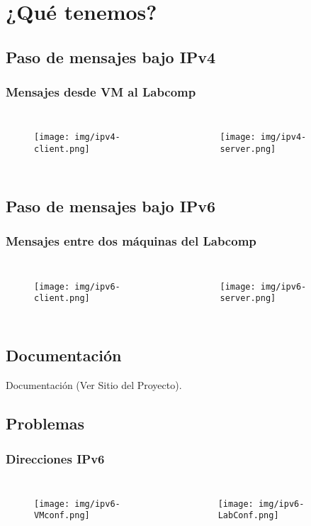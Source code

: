 \section{¿Qué tenemos?}
\subsection{Paso de mensajes bajo IPv4}
\begin{frame}
  \frametitle{Mensajes desde VM al Labcomp}
  \begin{columns}[t]
    	\begin{figure}
		\centering
		\texttt{[image: img/ipv4-client.png]}
	\end{figure}
    	\begin{figure}
		\centering
		\texttt{[image: img/ipv4-server.png]}
	\end{figure}
  \end{columns}
\end{frame}

\subsection{Paso de mensajes bajo IPv6}
\begin{frame}
  \frametitle{Mensajes entre dos máquinas del Labcomp}
  \begin{columns}[t]
    	\begin{figure}
		\centering
		\texttt{[image: img/ipv6-client.png]}
	\end{figure}
    	\begin{figure}
		\centering
		\texttt{[image: img/ipv6-server.png]}
	\end{figure}
   \end{columns}
\end{frame}

\subsection{Documentación}
\begin{frame}
	\centering
	Documentación (Ver Sitio del Proyecto).
\end{frame}


\subsection{Problemas}
\begin{frame}
  \frametitle{Direcciones IPv6}
   \begin{columns}[t]
    	\begin{figure}
		\centering
		\texttt{[image: img/ipv6-VMconf.png]}
	\end{figure}
    	\begin{figure}
		\centering
		\texttt{[image: img/ipv6-LabConf.png]}
	\end{figure}
    \end{columns}
\end{frame}

